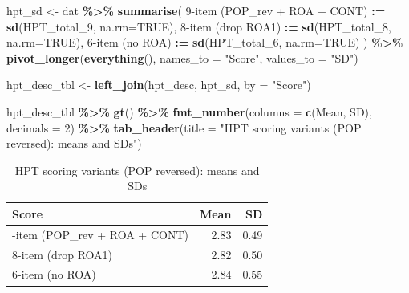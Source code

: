 \documentclass[
  10pt,
]{article}
\newenvironment{Shaded}{\begin{snugshade}}{\end{snugshade}}
\newcommand{\AttributeTok}[1]{\textcolor[rgb]{0.13,0.29,0.53}{#1}}
\newcommand{\ConstantTok}[1]{\textcolor[rgb]{0.56,0.35,0.01}{#1}}
\newcommand{\DecValTok}[1]{\textcolor[rgb]{0.00,0.00,0.81}{#1}}
\newcommand{\FunctionTok}[1]{\textcolor[rgb]{0.13,0.29,0.53}{\textbf{#1}}}
\newcommand{\NormalTok}[1]{#1}
\newcommand{\OtherTok}[1]{\textcolor[rgb]{0.56,0.35,0.01}{#1}}
\newcommand{\SpecialCharTok}[1]{\textcolor[rgb]{0.81,0.36,0.00}{\textbf{#1}}}
\newcommand{\StringTok}[1]{\textcolor[rgb]{0.31,0.60,0.02}{#1}}
\begin{document}
\begin{Shaded}
\begin{Highlighting}[]
\NormalTok{hpt\_sd }\OtherTok{\textless{}{-}}\NormalTok{ dat }\SpecialCharTok{\%\textgreater{}\%}
  \FunctionTok{summarise}\NormalTok{(}
    \StringTok{\textasciigrave{}}\AttributeTok{9{-}item (POP\_rev + ROA + CONT)}\StringTok{\textasciigrave{}} \SpecialCharTok{:=} \FunctionTok{sd}\NormalTok{(HPT\_total\_9,  }\AttributeTok{na.rm=}\ConstantTok{TRUE}\NormalTok{),}
    \StringTok{\textasciigrave{}}\AttributeTok{8{-}item (drop ROA1)}\StringTok{\textasciigrave{}}            \SpecialCharTok{:=} \FunctionTok{sd}\NormalTok{(HPT\_total\_8,  }\AttributeTok{na.rm=}\ConstantTok{TRUE}\NormalTok{),}
    \StringTok{\textasciigrave{}}\AttributeTok{6{-}item (no ROA)}\StringTok{\textasciigrave{}}               \SpecialCharTok{:=} \FunctionTok{sd}\NormalTok{(HPT\_total\_6,  }\AttributeTok{na.rm=}\ConstantTok{TRUE}\NormalTok{)}
\NormalTok{  ) }\SpecialCharTok{\%\textgreater{}\%}
  \FunctionTok{pivot\_longer}\NormalTok{(}\FunctionTok{everything}\NormalTok{(), }\AttributeTok{names\_to =} \StringTok{"Score"}\NormalTok{, }\AttributeTok{values\_to =} \StringTok{"SD"}\NormalTok{)}

\NormalTok{hpt\_desc\_tbl }\OtherTok{\textless{}{-}} \FunctionTok{left\_join}\NormalTok{(hpt\_desc, hpt\_sd, }\AttributeTok{by =} \StringTok{"Score"}\NormalTok{)}

\NormalTok{hpt\_desc\_tbl }\SpecialCharTok{\%\textgreater{}\%}
  \FunctionTok{gt}\NormalTok{() }\SpecialCharTok{\%\textgreater{}\%}
  \FunctionTok{fmt\_number}\NormalTok{(}\AttributeTok{columns =} \FunctionTok{c}\NormalTok{(Mean, SD), }\AttributeTok{decimals =} \DecValTok{2}\NormalTok{) }\SpecialCharTok{\%\textgreater{}\%}
  \FunctionTok{tab\_header}\NormalTok{(}\AttributeTok{title =} \StringTok{"HPT scoring variants (POP reversed): means and SDs"}\NormalTok{)}
\end{Highlighting}
\end{Shaded}

\begin{table}[t]
\caption*{
{\fontsize{20}{25}\selectfont  HPT scoring variants (POP reversed): means and SDs\fontsize{12}{15}\selectfont }
}
\fontsize{12.0pt}{14.0pt}\selectfont
\begin{tabular*}{\linewidth}{@{\extracolsep{\fill}}lrr}
\toprule
Score & Mean & SD \\
\midrule\addlinespace[2.5pt]
9-item (POP\_rev + ROA + CONT) & 2.83 & 0.49 \\
8-item (drop ROA1) & 2.82 & 0.50 \\
6-item (no ROA) & 2.84 & 0.55 \\
\bottomrule
\end{tabular*}
\end{table}
\end{document}
